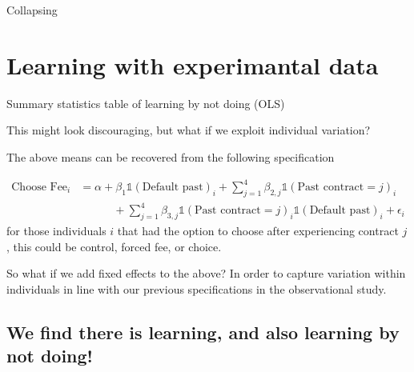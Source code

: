 \documentclass[oneside,11pt]{article}
\begin{document}
\begin{table}[H]
\caption{Collapsing}
\begin{center}
\scriptsize{}
\end{center}
 \scriptsize

\end{table}







\section{Learning with experimantal data}



\begin{table}[H]
\caption{Summary statistics table of learning by not doing (OLS)}
\begin{center}
\scriptsize{}
\end{center}
 \scriptsize

\end{table}
 
This might look discouraging, but what if we exploit individual variation?

The above means can be recovered from the following specification

\begin{align*}
    \text{Choose Fee}_{i} &=  \alpha +  \beta_1\mathds{1}(\text{Default past})_{i} +\sum_{j=1}^{4}\beta_{2,j}\mathds{1}(\text{Past contract}=j)_{i} \\
   &\qquad\quad  +\sum_{j=1}^{4}\beta_{3,j}\mathds{1}(\text{Past contract}=j)_{i}\mathds{1}(\text{Default past})_{i} + \epsilon_i
\end{align*}
for those individuals $i$ that had the option to choose after experiencing contract $j$, this could be control, forced fee, or choice. 

So what if we add fixed effects to the above? In order to capture variation within individuals in line with our previous specifications in the observational study.

\subsection*{We find there is learning, and also learning by not doing!}
\end{document}
